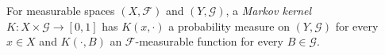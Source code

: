 
For measurable spaces $(X,\mathcal F)$ and $(Y,\mathcal G)$, a \emph{Markov kernel} $K:X\times\mathcal G\to[0,1]$ has $K(x,\cdot)$ a probability measure on $(Y,\mathcal G)$ for every $x\in X$ and $K(\cdot,B)$ an $\mathcal F$-measurable function for every $B\in\mathcal G$.
